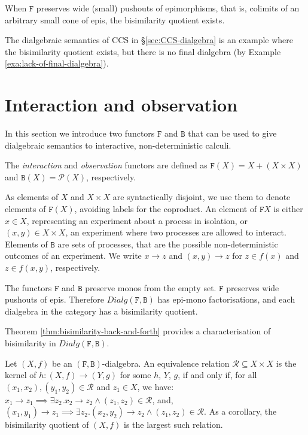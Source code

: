 \documentclass[orivec]{llncs}
\newcommand{\mF}[1]{\mathtt{#1}}
\newcommand{\F}{\mF{F}}
\newcommand{\B}{\mF{B}}
\newcommand{\dialg}{\mathit{Dialg}}
\newcommand{\utr}{\to}
\newcommand{\Pow}{\mathcal{P}}
\newcommand{\R}{\mathcal{R}}
\newcommand{\defend}{}
\renewenvironment{definition}{\begin{defn}}{\defend\end{defn}}
\renewenvironment{theorem}{\begin{thm}}{\defend\end{thm}}
\begin{document}
\begin{proposition}\label{pro:existence-bisimilarity-quotients}
	When $\F$ preserves wide (small) pushouts of epimorphisms, that is, colimits of an arbitrary small cone of epis, the bisimilarity quotient exists.
\end{proposition}

The dialgebraic semantics of CCS in \S \ref{sec:CCS-dialgebra} is an example where the bisimilarity quotient exists, but there is no final dialgebra (by Example \ref{exa:lack-of-final-dialgebra}).

\section{Interaction and observation}
\label{sec:interaction-and-observation-functors}

In this section we introduce two functors $\F$ and $\B$ that can be used to give dialgebraic semantics to interactive, non-deterministic calculi.

\begin{definition}\label{def:int-and-obs-functors}
	The \emph{interaction} and \emph{observation} functors are defined as $\F(X) = X + (X \times X)$ and $\B(X) = \Pow(X)$, respectively.
\end{definition}

As elements of $X$ and $X \times X$ are syntactically disjoint, we use them to denote elements of $\F(X)$, avoiding labels for the coproduct. An element of $\F X$ is either $x \in X$, representing an experiment about a process in isolation, or $(x,y) \in X \times X$, an experiment where two processes are allowed to interact. Elements of $\B$ are sets of processes, that are the possible non-deterministic outcomes of an experiment. We write $x \utr z$ and $(x,y) \utr z$ for $z \in f(x)$ and $z \in f(x,y)$, respectively.


\begin{proposition}\label{pro:int-obs-epi-mono-bisim-quotient}
	The functors $\F$ and $\B$ preserve monos from the empty set. $\F$ preserves wide pushouts of epis. Therefore $\dialg(\F,\B)$ has epi-mono factorisations, and each dialgebra in the category has a bisimilarity quotient.
\end{proposition}

\noindent Theorem \ref{thm:bisimilarity-back-and-forth} provides a characterisation of bisimilarity in $\dialg(\F,\B)$.


\begin{theorem}\label{thm:bisimilarity-back-and-forth}
 Let $(X,f)$ be an $(\F,\B)$-dialgebra. An equivalence relation $\R\subseteq X \times X$ is the kernel of $h : (X,f) \to (Y,g)$ for some $h$, $Y$, $g$, if and only if, for all $(x_1,x_2), (y_1,y_2) \in \R$ and $z_1\in X$, we have: $x_1 \utr z_1 \implies \exists z_2 . x_2 \utr z_2 \land (z_1,z_2) \in \R$, and, $(x_1,y_1) \utr z_1 \implies \exists z_2 . (x_2,y_2) \utr z_2 \land (z_1, z_2) \in \R$. As a corollary, the bisimilarity quotient of $(X,f)$ is the largest such relation.
\end{theorem}
\end{document}
